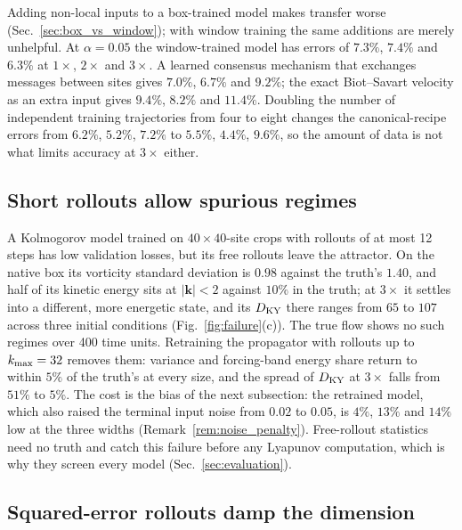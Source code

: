 Adding non-local inputs to a box-trained model makes transfer worse
(Sec.~\ref{sec:box_vs_window}); with window training the same additions
are merely unhelpful. At $\alpha=0.05$ the window-trained model has errors
of $7.3\%$, $7.4\%$ and $6.3\%$ at $1\times$, $2\times$ and $3\times$. A learned
consensus mechanism that exchanges messages between sites gives $7.0\%$,
$6.7\%$ and $9.2\%$; the exact Biot--Savart velocity as an extra input gives
$9.4\%$, $8.2\%$ and $11.4\%$. Doubling the number of independent training
trajectories from four to eight changes the canonical-recipe errors from
$6.2\%$, $5.2\%$, $7.2\%$ to $5.5\%$, $4.4\%$, $9.6\%$, so the amount of data is
not what limits accuracy at $3\times$ either.

\subsection{Short rollouts allow spurious regimes}
\label{sec:fail_regimes}

A Kolmogorov model trained on $40\times40$-site crops with rollouts of at
most 12 steps has low validation losses, but its free rollouts leave the
attractor. On the native box its vorticity standard deviation is $0.98$
against the truth's $1.40$, and half of its kinetic energy sits at
$|\bm k|<2$ against $10\%$ in the truth; at $3\times$ it settles into a
different, more energetic state, and its $D_{\mathrm{KY}}$ there ranges from $65$ to
$107$ across three initial conditions (Fig.~\ref{fig:failure}(c)). The
true flow shows no such regimes over 400 time units. Retraining the
propagator with rollouts up to $k_{\max}=32$ removes them: variance and
forcing-band energy share return to within $5\%$ of the truth's at every
size, and the spread of $D_{\mathrm{KY}}$ at $3\times$ falls from $51\%$ to $5\%$. The
cost is the bias of the next subsection: the retrained model, which
also raised the terminal input noise from $0.02$ to $0.05$, is $4\%$, $13\%$
and $14\%$ low at the three widths (Remark~\ref{rem:noise_penalty}).
Free-rollout statistics need no truth and catch this failure before
any Lyapunov computation, which is why they screen every model
(Sec.~\ref{sec:evaluation}).

\subsection{Squared-error rollouts damp the dimension}
\label{sec:fail_mse}

